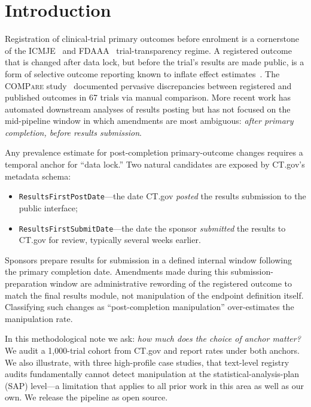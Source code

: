 \documentclass[11pt,a4paper]{article}
\begin{document}
\section{Introduction}

Registration of clinical-trial primary outcomes before enrolment is a
cornerstone of the ICMJE~\cite{icmje2005} and FDAAA~\cite{fdaaa2007,%
fdaaa_final_rule_2016} trial-transparency regime. A registered outcome
that is changed after data lock, but before the trial's results are
made public, is a form of selective outcome reporting known to inflate
effect estimates~\cite{dwan2008outcome,li2018ct_protocol_deviation}.
The \textsc{COMPare} study~\cite{goldacre2019compare} documented
pervasive discrepancies between registered and published outcomes in
67 trials via manual comparison. More recent work
\cite{heneghan2017trialstracker,zarin2019ctgov} has automated
downstream analyses of results posting but has not focused on the
mid-pipeline window in which amendments are most ambiguous:
\emph{after primary completion, before results submission}.

Any prevalence estimate for post-completion primary-outcome changes
requires a temporal anchor for ``data lock.'' Two natural candidates
are exposed by CT.gov's metadata schema:
\begin{itemize}\setlength\itemsep{0.2em}
    \item \texttt{ResultsFirstPostDate}---the date CT.gov \emph{posted} the
          results submission to the public interface;
    \item \texttt{ResultsFirstSubmitDate}---the date the sponsor
          \emph{submitted} the results to CT.gov for review, typically
          several weeks earlier.
\end{itemize}
Sponsors prepare results for submission in a defined internal window
following the primary completion date. Amendments made during this
submission-preparation window are administrative rewording of the
registered outcome to match the final results module, not
manipulation of the endpoint definition itself. Classifying such
changes as ``post-completion manipulation'' over-estimates the
manipulation rate.

In this methodological note we ask: \emph{how much does the choice of
anchor matter?} We audit a 1{,}000-trial cohort from CT.gov and report
rates under both anchors. We also illustrate, with three high-profile
case studies, that text-level registry audits fundamentally cannot
detect manipulation at the statistical-analysis-plan (SAP)
level---a limitation that applies to all prior work in this area as
well as our own. We release the pipeline as open source.
\end{document}
